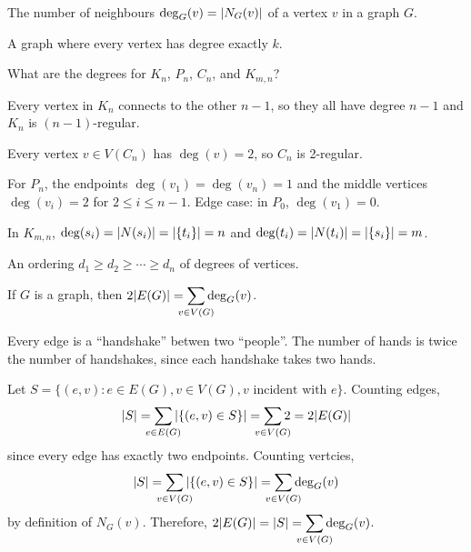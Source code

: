 \begin{defn}[degree]
  The number of neighbours $\deg_G(v) = \abs{N_G(v)}$ of a vertex $v$ in a graph $G$.
\end{defn}

\begin{defn}[$k$-regularity]
  A graph where every vertex has degree exactly $k$.
\end{defn}

\begin{example}
  What are the degrees for $K_n$, $P_n$, $C_n$, and $K_{m,n}$?
\end{example}
\begin{sol}
  Every vertex in $K_n$ connects to the other $n-1$,
  so they all have degree $n-1$ and $K_n$ is $(n-1)$-regular.

  Every vertex $v \in V(C_n)$ has $\deg(v) = 2$, so $C_n$ is 2-regular.

  For $P_n$, the endpoints $\deg(v_1) = \deg(v_n) = 1$
  and the middle vertices $\deg(v_i) = 2$ for $2 \leq i \leq n-1$.
  Edge case: in $P_0$, $\deg(v_1) = 0$.

  In $K_{m,n}$, $\deg(s_i) = \abs{N(s_i)} = \abs{\{t_i\}} = n$
  and $\deg(t_i) = \abs{N(t_i)} = \abs{\{s_i\}} = m$.
\end{sol}

\begin{defn}
  An ordering $d_1 \geq d_2 \geq \dotsb \geq d_n$ of degrees of vertices.
\end{defn}

\begin{theorem}\label{thm:hand}
  If $G$ is a graph, then $2\abs{E(G)} = \smashoperator{\sum\limits_{v \in V(G)}} \deg_G(v)$.
\end{theorem}
\begin{prf}[Informal]
  Every edge is a ``handshake'' betwen two ``people''.
  The number of hands is twice the number of handshakes,
  since each handshake takes two hands.
\end{prf}
\begin{prf}[Formal]
  Let $S = \{(e,v) : e \in E(G), v \in V(G), \text{$v$ incident with $e$}\}$.
  Counting edges,
  \[
    \abs{S} = \smashoperator{\sum_{e \in E(G)}} \abs{\{(e,v) \in S\}}
    = \smashoperator{\sum_{v \in V(G)}} 2
    = 2 \abs{E(G)}
  \]
  since every edge has exactly two endpoints.
  Counting vertcies,
  \[
    \abs{S} = \smashoperator{\sum_{v \in V(G)}} \abs{\{(e,v) \in S\}}
    = \smashoperator{\sum_{v \in V(G)}} \deg_G(v)
  \]
  by definition of $N_G(v)$.
  Therefore, $2\abs{E(G)} = \abs{S} = \smashoperator{\sum\limits_{v \in V(G)}} \deg_G(v)$.
\end{prf}

